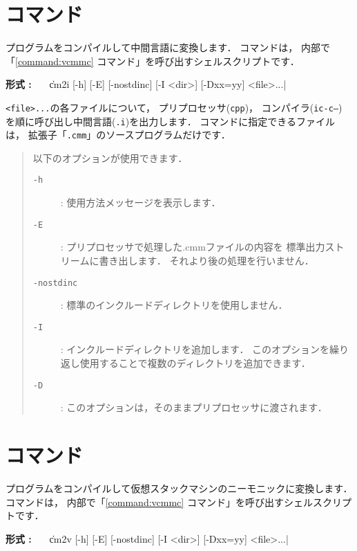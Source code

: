 \section{{\cmi}コマンド}

{\cmm}プログラムをコンパイルして中間言語に変換します．
{\cmi}コマンドは，
内部で「\ref{command:vcmmc} {\icmmc}コマンド」を呼び出すシェルスクリプトです．

\begin{flushleft}
{\bf 形式 : }~~~\|cm2i [-h] [-E] [-nostdinc] [-I <dir>] [-Dxx=yy] <file>...|
\end{flushleft}

{\tt <file>...}の各ファイルについて，
プリプロセッサ({\tt cpp})，
コンパイラ({\tt ic-c--})
を順に呼び出し中間言語({\tt .i})を出力します．
{\cmi}コマンドに指定できるファイルは，
拡張子「{\tt .cmm}」の{\cmml}ソースプログラムだけです．

\begin{quote}
\hspace{-1em}以下のオプションが使用できます．

\begin{description}
\item[{\tt -h}] : 使用方法メッセージを表示します．
\item[{\tt -E}] : プリプロセッサで処理した{.cmm}ファイルの内容を
標準出力ストリームに書き出します．
それより後の処理を行いません．
\item[{\tt -nostdinc}] : 標準のインクルードディレクトリを使用しません．
\item[{\tt -I}] : インクルードディレクトリを追加します．
このオプションを繰り返し使用することで複数のディレクトリを追加できます．
\item[{\tt -D}] : このオプションは，そのままプリプロセッサに渡されます．
\end{description}
\end{quote}

\section{{\cmv}コマンド}

{\cmm}プログラムをコンパイルして仮想スタックマシンのニーモニックに変換します．
{\cmv}コマンドは，
内部で「\ref{command:vcmmc} {\vcmmc}コマンド」を呼び出すシェルスクリプトです．

\begin{flushleft}
{\bf 形式 : }~~~\|cm2v [-h] [-E] [-nostdinc] [-I <dir>] [-Dxx=yy] <file>...|
\end{flushleft}

